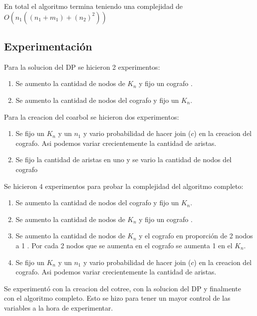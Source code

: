 En total el algoritmo termina teniendo una complejidad de $O(n_1((n_1 + m_1) + (n_2)^2 ))$

\subsection{Experimentación}

    

    Para la solucion del DP se hicieron 2 experimentos:

    \begin{enumerate}
        \item Se aumento la cantidad de nodos de $K_n$ y fijo un cografo .
        \item Se aumento la cantidad de nodos del cografo y fijo un $K_n$. 
    \end{enumerate}

    Para la creacion del coarbol se hicieron dos experimentos:

    \begin{enumerate}
    
        \item Se fijo un $K_n$ y un $n_1$ y vario probabilidad de hacer join ($c$) en la creacion del cografo. Asi podemos variar crecientemente la cantidad de aristas.
        \item Se fijo la cantidad de aristas en uno y se vario la cantidad de nodos del cografo

    \end{enumerate}


    Se hicieron 4 experimentos para probar la complejidad del algoritmo completo:

    \begin{enumerate}
    \item Se aumento la cantidad de nodos del cografo y fijo un $K_n$. 
    \item Se aumento la cantidad de nodos de $K_n$ y fijo un cografo .
    \item Se aumento la cantidad de nodos de $K_n$ y el cografo en proporción de 2 nodos a 1 . Por cada 2 nodos que se aumenta en el cografo se aumenta 1 en el $K_n$.
    \item Se fijo un $K_n$ y un $n_1$ y vario probabilidad de hacer join ($c$) en la creacion del cografo. Asi podemos variar crecientemente la cantidad de aristas.
    \end{enumerate}

    Se experimentó con la creacion del cotree, con la solucion del DP y finalmente con el algoritmo completo.
    Esto se hizo para tener un mayor control de las variables a la hora de experimentar.

